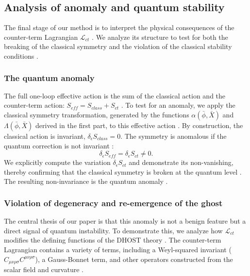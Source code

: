\documentclass[twocolumn]{aastex631}
\begin{document}
\subsection{Analysis of anomaly and quantum stability}
The final stage of our method is to interpret the physical consequences of the counter-term Lagrangian $\mathcal{L}_{ct}$  \citep{sharma2023galileanfermionsclassicalquantum,krššák2025einsteingravityeinsteinaction,solera2026symmetryrestoringfinitecountertermssmeft}. We analyze its structure to test for both the breaking of the classical symmetry and the violation of the classical stability conditions  \citep{solera2026symmetryrestoringfinitecountertermssmeft}.

\subsubsection{The quantum anomaly}
The full one-loop effective action is the sum of the classical action and the counter-term action: $S_{eff} = S_{class} + S_{ct}$ \citep{avramidi1996covariantmethodscalculationeffective,chakrabortty2025loopthermaleffectiveaction}. To test for an anomaly, we apply the classical symmetry transformation, generated by the functions $\alpha(\bar{\phi}, \bar{X})$ and $\Lambda(\bar{\phi}, \bar{X})$ derived in the first part, to this effective action \citep{wetterich2024fieldtransformationsfunctionalintegral}. By construction, the classical action is invariant, $\delta_\epsilon S_{class} = 0$. The symmetry is anomalous if the quantum correction is not invariant \citep{avramidi1996covariantmethodscalculationeffective,chakrabortty2025loopthermaleffectiveaction}:
\begin{equation}\delta_\epsilon S_{eff} = \delta_\epsilon S_{ct} \neq 0.\end{equation}
We explicitly compute the variation $\delta_\epsilon S_{ct}$ and demonstrate its non-vanishing, thereby confirming that the classical symmetry is broken at the quantum level \citep{coon2002anomaliesquantummechanics1r2,seiberg2025anomalouscontinuoustranslations}. The resulting non-invariance is the quantum anomaly \citep{mauro2005cancellationanomaliespathintegral}.

\subsubsection{Violation of degeneracy and re-emergence of the ghost}
The central thesis of our paper is that this anomaly is not a benign feature but a direct signal of quantum instability. To demonstrate this, we analyze how $\mathcal{L}_{ct}$ modifies the defining functions of the DHOST theory \citep{gao2019higherderivativescalartensortheory}. The counter-term Lagrangian contains a variety of terms, including a Weyl-squared invariant ($C_{\mu\nu\rho\sigma}C^{\mu\nu\rho\sigma}$), a Gauss-Bonnet term, and other operators constructed from the scalar field and curvature \citep{brandt2022quantumgravitygeneralbackground}.
\end{document}
